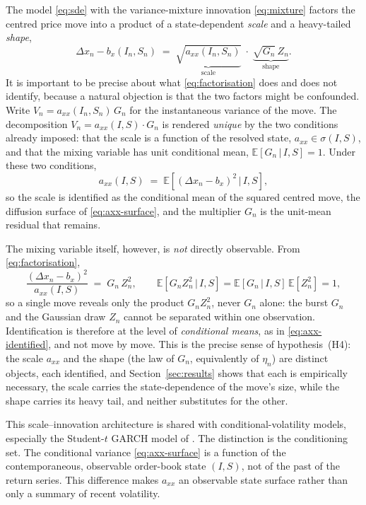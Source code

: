 \documentclass[11pt]{article}
\theoremstyle{plain}
\theoremstyle{definition}
\newcommand{\E}{\mathbb{E}}
\newcommand{\given}{\,\vert\,}
\newcommand{\axx}{a_{xx}}
\begin{document}
The model \eqref{eq:sde} with the variance-mixture innovation \eqref{eq:mixture}
factors the centred price move into a product of a state-dependent \emph{scale} and
a heavy-tailed \emph{shape},
\begin{equation}
  \Delta x_n - b_x(I_n,S_n)
  \;=\; \underbrace{\sqrt{\axx(I_n,S_n)}}_{\text{scale}}\;\cdot\;
  \underbrace{\sqrt{G_n}\,Z_n}_{\text{shape}}.
  \label{eq:factorisation}
\end{equation}
It is important to be precise about what \eqref{eq:factorisation} does and does not
identify, because a natural objection is that the two factors might be confounded.
Write $V_n = \axx(I_n,S_n)\,G_n$ for the instantaneous variance of the move. The
decomposition $V_n = \axx(I,S)\cdot G_n$ is rendered \emph{unique} by the two
conditions already imposed: that the scale is a function of the resolved state,
$\axx\in\sigma(I,S)$, and that the mixing variable has unit conditional mean,
$\E[G_n\given I,S]=1$. Under these two conditions,
\begin{equation}
  \axx(I,S) \;=\; \E\!\left[(\Delta x_n-b_x)^2 \given I,S\right],
  \label{eq:axx-identified}
\end{equation}
so the scale is identified as the conditional mean of the squared centred move, the
diffusion surface of \eqref{eq:axx-surface}, and the multiplier $G_n$ is the
unit-mean residual that remains.

The mixing variable itself, however, is \emph{not} directly observable. From
\eqref{eq:factorisation},
\begin{equation}
  \frac{(\Delta x_n - b_x)^2}{\axx(I,S)} \;=\; G_n\,Z_n^2,
  \qquad
  \E\!\left[G_n Z_n^2 \given I,S\right]
  = \E[G_n\given I,S]\,\E[Z_n^2] = 1,
  \label{eq:gz2}
\end{equation}
so a single move reveals only the product $G_n Z_n^2$, never $G_n$ alone: the burst
$G_n$ and the Gaussian draw $Z_n$ cannot be separated within one observation.
Identification is therefore at the level of \emph{conditional means}, as in
\eqref{eq:axx-identified}, and not move by move. This is the precise sense of
hypothesis~(H4): the scale $\axx$ and the shape (the law of $G_n$, equivalently of
$\eta_n$) are distinct objects, each identified, and Section~\ref{sec:results} shows
that each is empirically necessary, the scale carries the state-dependence of the
move's size, while the shape carries its heavy tail, and neither substitutes for the
other.

This scale--innovation architecture is shared with conditional-volatility models,
especially the Student-$t$ GARCH model of \citet{bollerslev1987}. The distinction is
the conditioning set. The conditional variance \eqref{eq:axx-surface} is a function
of the contemporaneous, observable order-book state $(I,S)$, not of the past of the
return series. This difference makes $\axx$ an observable state surface rather than
only a summary of recent volatility.
\end{document}
